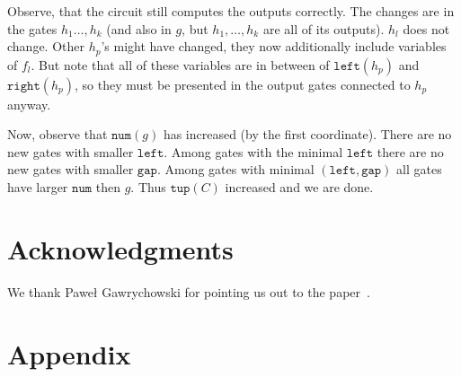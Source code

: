 \documentclass[11pt,letterpaper]{article}
\newcommand{\lef}{\texttt{left}}
\newcommand{\righ}{\texttt{right}}
\newcommand{\gap}{\texttt{gap}}
\newcommand{\num}{\texttt{num}}
\newcommand{\tup}{\texttt{tup}}
\begin{document}
Observe, that the circuit still computes the outputs correctly. The changes are in the gates $h_1\ldots, h_k$ (and also in $g$, but $h_1,\ldots, h_k$ are all of its outputs). $h_l$ does not change. Other $h_p$'s might have changed, they now additionally include variables of $f_l$. But note that all of these variables are in between of $\lef(h_p)$ and $\righ(h_p)$, so they must be presented in the output gates connected to $h_p$ anyway.

Now, observe that $\num(g)$ has increased (by the first coordinate). There are no new gates with smaller $\lef$. Among gates with the minimal $\lef$ there are no new gates with smaller $\gap$. Among gates with minimal $(\lef,\gap)$ all gates have larger $\num$ then $g$. Thus $\tup(C)$ increased and we are done.


\section{Acknowledgments}
We thank Paweł Gawrychowski for pointing us out to the paper~\cite{DBLP:journals/ijcga/ChazelleR91}.




\section{Appendix}



\end{document}

